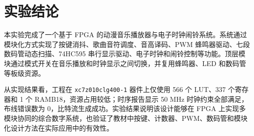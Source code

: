 \documentclass[UTF8,a4paper,12pt]{ctexart}
\begin{document}
\section{实验结论}

本实验完成了一个基于 FPGA 的动漫音乐播放器与电子时钟闹铃系统。系统通过模块化方式实现了按键消抖、歌曲音符调度、音高译码、PWM 蜂鸣器驱动、七段数码管动态扫描、74HC595 串行显示驱动、电子时钟和闹铃控制等功能。顶层模块通过模式开关在音乐播放和时钟显示之间切换，并复用蜂鸣器、LED 和数码管等板级资源。

从实现结果看，工程在 \verb|xc7z010clg400-1| 器件上仅使用 566 个 LUT、337 个寄存器和 1 个 RAMB18，资源占用较低；时序报告显示 50 MHz 时钟约束全部满足，布线错误数为 0，比特流生成成功。实验结果说明该设计能够在 FPGA 上实现多模块协同的综合数字系统，也验证了教材中按键、计数器、PWM、数码管和模块化设计方法在实际应用中的有效性。
\end{document}
